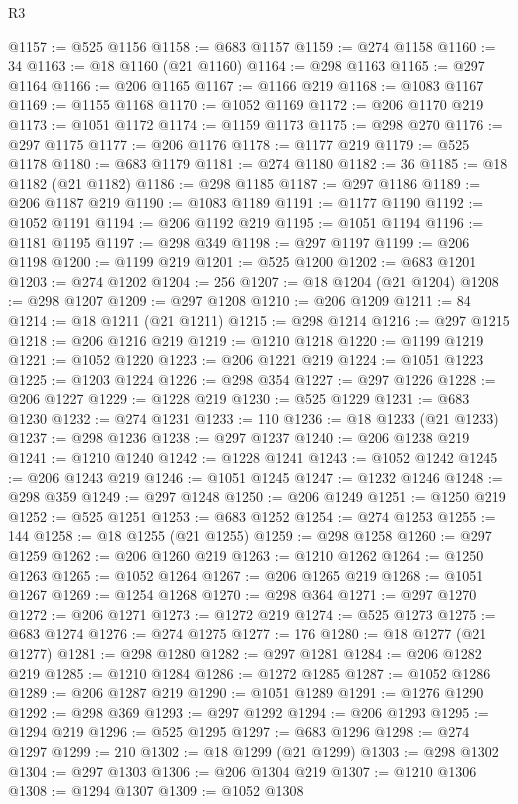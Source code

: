 \begin{lexlean}{R3}
\begin{coremodule}
@1157 := @525 @1156
@1158 := @683 @1157
@1159 := @274 @1158
@1160 := 34
@1163 := @18 @1160 (@21 @1160)
@1164 := @298 @1163
@1165 := @297 @1164
@1166 := @206 @1165
@1167 := @1166 @219
@1168 := @1083 @1167
@1169 := @1155 @1168
@1170 := @1052 @1169
@1172 := @206 @1170 @219
@1173 := @1051 @1172
@1174 := @1159 @1173
@1175 := @298 @270
@1176 := @297 @1175
@1177 := @206 @1176
@1178 := @1177 @219
@1179 := @525 @1178
@1180 := @683 @1179
@1181 := @274 @1180
@1182 := 36
@1185 := @18 @1182 (@21 @1182)
@1186 := @298 @1185
@1187 := @297 @1186
@1189 := @206 @1187 @219
@1190 := @1083 @1189
@1191 := @1177 @1190
@1192 := @1052 @1191
@1194 := @206 @1192 @219
@1195 := @1051 @1194
@1196 := @1181 @1195
@1197 := @298 @349
@1198 := @297 @1197
@1199 := @206 @1198
@1200 := @1199 @219
@1201 := @525 @1200
@1202 := @683 @1201
@1203 := @274 @1202
@1204 := 256
@1207 := @18 @1204 (@21 @1204)
@1208 := @298 @1207
@1209 := @297 @1208
@1210 := @206 @1209
@1211 := 84
@1214 := @18 @1211 (@21 @1211)
@1215 := @298 @1214
@1216 := @297 @1215
@1218 := @206 @1216 @219
@1219 := @1210 @1218
@1220 := @1199 @1219
@1221 := @1052 @1220
@1223 := @206 @1221 @219
@1224 := @1051 @1223
@1225 := @1203 @1224
@1226 := @298 @354
@1227 := @297 @1226
@1228 := @206 @1227
@1229 := @1228 @219
@1230 := @525 @1229
@1231 := @683 @1230
@1232 := @274 @1231
@1233 := 110
@1236 := @18 @1233 (@21 @1233)
@1237 := @298 @1236
@1238 := @297 @1237
@1240 := @206 @1238 @219
@1241 := @1210 @1240
@1242 := @1228 @1241
@1243 := @1052 @1242
@1245 := @206 @1243 @219
@1246 := @1051 @1245
@1247 := @1232 @1246
@1248 := @298 @359
@1249 := @297 @1248
@1250 := @206 @1249
@1251 := @1250 @219
@1252 := @525 @1251
@1253 := @683 @1252
@1254 := @274 @1253
@1255 := 144
@1258 := @18 @1255 (@21 @1255)
@1259 := @298 @1258
@1260 := @297 @1259
@1262 := @206 @1260 @219
@1263 := @1210 @1262
@1264 := @1250 @1263
@1265 := @1052 @1264
@1267 := @206 @1265 @219
@1268 := @1051 @1267
@1269 := @1254 @1268
@1270 := @298 @364
@1271 := @297 @1270
@1272 := @206 @1271
@1273 := @1272 @219
@1274 := @525 @1273
@1275 := @683 @1274
@1276 := @274 @1275
@1277 := 176
@1280 := @18 @1277 (@21 @1277)
@1281 := @298 @1280
@1282 := @297 @1281
@1284 := @206 @1282 @219
@1285 := @1210 @1284
@1286 := @1272 @1285
@1287 := @1052 @1286
@1289 := @206 @1287 @219
@1290 := @1051 @1289
@1291 := @1276 @1290
@1292 := @298 @369
@1293 := @297 @1292
@1294 := @206 @1293
@1295 := @1294 @219
@1296 := @525 @1295
@1297 := @683 @1296
@1298 := @274 @1297
@1299 := 210
@1302 := @18 @1299 (@21 @1299)
@1303 := @298 @1302
@1304 := @297 @1303
@1306 := @206 @1304 @219
@1307 := @1210 @1306
@1308 := @1294 @1307
@1309 := @1052 @1308

\end{coremodule}
\end{lexlean}
